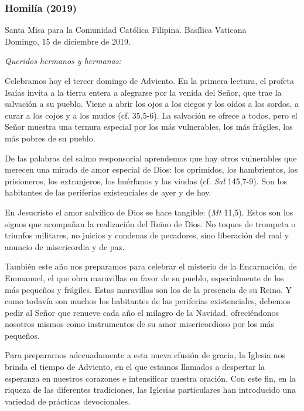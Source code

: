 \subsubsection{Homilía (2019)}

Santa Misa para la Comunidad Católica Filipina. Basílica Vaticana\\ Domingo, 15 de diciembre de 2019.





\emph{Queridos hermanos y hermanas:}

Celebramos hoy el tercer domingo de Adviento. En la primera lectura, el profeta Isaías invita a la tierra entera a alegrarse por la venida del Señor, que trae la salvación a su pueblo. Viene a abrir los ojos a los ciegos y los oídos a los sordos, a curar a los cojos y a los mudos (cf. 35,5-6). La salvación se ofrece a todos, pero el Señor muestra una ternura especial por los más vulnerables, los más frágiles, los más pobres de su pueblo.

De las palabras del salmo responsorial aprendemos que hay otros vulnerables que merecen una mirada de amor especial de Dios: los oprimidos, los hambrientos, los prisioneros, los extranjeros, los huérfanos y las viudas (cf. \emph{Sal} 145,7-9). Son los habitantes de las periferias existenciales de ayer y de hoy.

En Jesucristo el amor salvífico de Dios se hace tangible:  (\emph{Mt} 11,5). Estos son los signos que acompañan la realización del Reino de Dios. No toques de trompeta o triunfos militares, no juicios y condenas de pecadores, sino liberación del mal y anuncio de misericordia y de paz.

También este año nos preparamos para celebrar el misterio de la Encarnación, de Emmanuel, el  que obra maravillas en favor de su pueblo, especialmente de los más pequeños y frágiles. Estas maravillas son los  de la presencia de su Reino. Y como todavía son muchos los habitantes de las periferias existenciales, debemos pedir al Señor que renueve cada año el milagro de la Navidad, ofreciéndonos nosotros mismos como instrumentos de su amor misericordioso por los más pequeños.

Para prepararnos adecuadamente a esta nueva efusión de gracia, la Iglesia nos brinda el tiempo de Adviento, en el que estamos llamados a despertar la esperanza en nuestros corazones e intensificar nuestra oración. Con este fin, en la riqueza de las diferentes tradiciones, las Iglesias particulares han introducido una variedad de prácticas devocionales.

